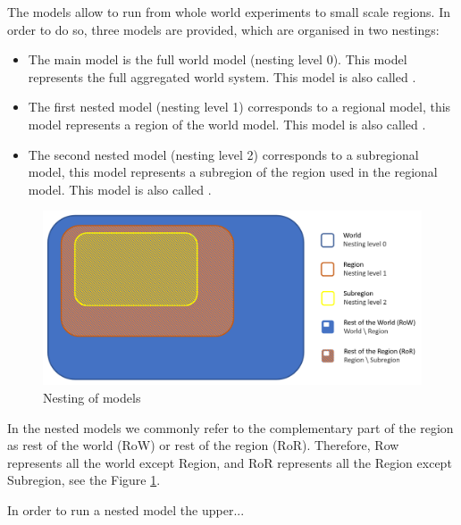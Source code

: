 The \model models allow to run from whole world experiments to small scale regions. In order to do so, three \model models are provided, which are organised in two nestings:
\begin{itemize}
    \item The main model is the full world model (nesting level 0). This model represents the full aggregated world system. This model is also called .
    \item The first nested model (nesting level 1) corresponds to a regional model, this model represents a region of the world model. This model is also called .
    \item The second nested model (nesting level 2) corresponds to a subregional model, this model represents a subregion of the region used in the regional model.  This model is also called .
\end{itemize}

\begin{figure}[H]
    \includegraphics[width=\textwidth]{figures/nesting.png}
    \caption{Nesting of \model models}
    \label{fig:nesting}
\end{figure}

In the nested models we commonly refer to the complementary part of the region as rest of the world (RoW) or rest of the region (RoR). Therefore, Row represents all the world except Region, and RoR represents all the Region except Subregion, see the Figure \ref{fig:nesting}.

In order to run a nested model the upper... 

